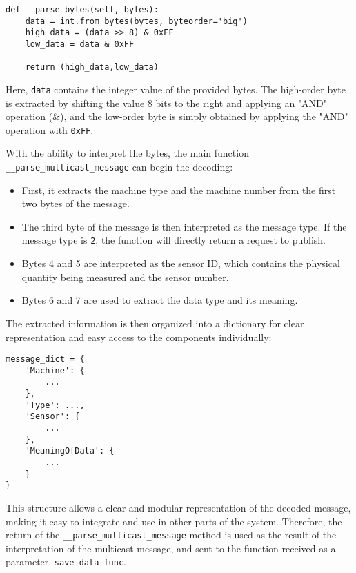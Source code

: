 \begin{verbatim}
def __parse_bytes(self, bytes):
    data = int.from_bytes(bytes, byteorder='big')
    high_data = (data >> 8) & 0xFF
    low_data = data & 0xFF

    return (high_data,low_data)
\end{verbatim}

Here, \texttt{data} contains the integer value of the provided bytes. The high-order byte is extracted by shifting the value 8 bits to the right and applying an "AND" operation (\&), and the low-order byte is simply obtained by applying the "AND" operation with \texttt{0xFF}.

With the ability to interpret the bytes, the main function \texttt{\_\_parse\_multicast\_message} can begin the decoding:

\begin{itemize}
    \item First, it extracts the machine type and the machine number from the first two bytes of the message.
    
    \item The third byte of the message is then interpreted as the message type. If the message type is \texttt{2}, the function will directly return a request to publish.
    
    \item Bytes 4 and 5 are interpreted as the sensor ID, which contains the physical quantity being measured and the sensor number.
    
    \item Bytes 6 and 7 are used to extract the data type and its meaning.
\end{itemize}

The extracted information is then organized into a dictionary for clear representation and easy access to the components individually:

\begin{verbatim}
message_dict = {
    'Machine': {
        ...
    },
    'Type': ...,
    'Sensor': {
        ...
    },
    'MeaningOfData': {
        ...
    }
}
\end{verbatim}

This structure allows a clear and modular representation of the decoded message, making it easy to integrate and use in other parts of the system. Therefore, the return of the \texttt{\_\_parse\_multicast\_message} method is used as the result of the interpretation of the multicast message, and sent to the function received as a parameter, \texttt{save\_data\_func}.

